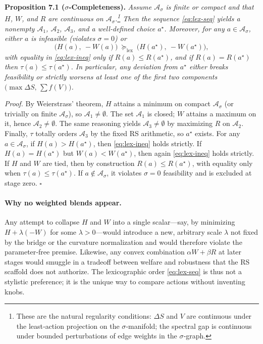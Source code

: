 \documentclass[11pt]{article}
\begin{document}
\medskip
\noindent\textbf{Proposition 7.1 ($\sigma$-Completeness).}
\emph{Assume $\mathcal{A}_\sigma$ is finite or compact and that $H$, $W$, and $R$ are continuous on $\mathcal{A}_\sigma$.\footnote{These are the natural regularity conditions: $\Delta S$ and $V$ are continuous under the least‑action projection on the $\sigma$‑manifold; the spectral gap is continuous under bounded perturbations of edge weights in the $\sigma$‑graph.} Then the sequence \eqref{eq:lex-seq} yields a nonempty $\mathcal{A}_1$, $\mathcal{A}_2$, $\mathcal{A}_3$, and a well‑defined choice $a^\star$. Moreover, for any $a\in\mathcal{A}_\sigma$, either $a$ is infeasible (violates $\sigma\!=\!0$) or}
\begin{equation}
\big(H(a),\ -W(a)\big)
\ \succeq_{\mathrm{lex}}\
\big(H(a^\star),\ -W(a^\star)\big),
\label{eq:lex-ineq}
\end{equation}
\emph{with equality in \eqref{eq:lex-ineq} only if $R(a)\le R(a^\star)$, and if $R(a)=R(a^\star)$ then $\tau(a)\le \tau(a^\star)$. In particular, any deviation from $a^\star$ either breaks feasibility or strictly worsens at least one of the first two components $\big(\max\Delta S,\,\sum f(V)\big)$.}

\medskip
\noindent\emph{Proof.}
By Weierstrass’ theorem, $H$ attains a minimum on compact $\mathcal{A}_\sigma$ (or trivially on finite $\mathcal{A}_\sigma$), so $\mathcal{A}_1\neq\emptyset$. The set $\mathcal{A}_1$ is closed; $W$ attains a maximum on it, hence $\mathcal{A}_2\neq\emptyset$. The same reasoning yields $\mathcal{A}_3\neq\emptyset$ by maximizing $R$ on $\mathcal{A}_2$. Finally, $\tau$ totally orders $\mathcal{A}_3$ by the fixed RS arithmetic, so $a^\star$ exists. For any $a\in\mathcal{A}_\sigma$, if $H(a)>H(a^\star)$, then \eqref{eq:lex-ineq} holds strictly. If $H(a)=H(a^\star)$ but $W(a)<W(a^\star)$, then again \eqref{eq:lex-ineq} holds strictly. If $H$ and $W$ are tied, then by construction $R(a)\le R(a^\star)$, with equality only when $\tau(a)\le \tau(a^\star)$. If $a\notin\mathcal{A}_\sigma$, it violates $\sigma\!=\!0$ feasibility and is excluded at stage zero. \hfill$\square$

\paragraph{Why no weighted blends appear.}
Any attempt to collapse $H$ and $W$ into a single scalar—say, by minimizing $H+\lambda(-W)$ for some $\lambda>0$—would introduce a new, arbitrary scale $\lambda$ not fixed by the bridge or the curvature normalization and would therefore violate the parameter‑free premise. Likewise, any convex combination $\alpha W+\beta R$ at later stages would smuggle in a tradeoff between welfare and robustness that the RS scaffold does not authorize. The lexicographic order \eqref{eq:lex-seq} is thus not a stylistic preference; it is the unique way to compare actions without inventing knobs.
\end{document}
